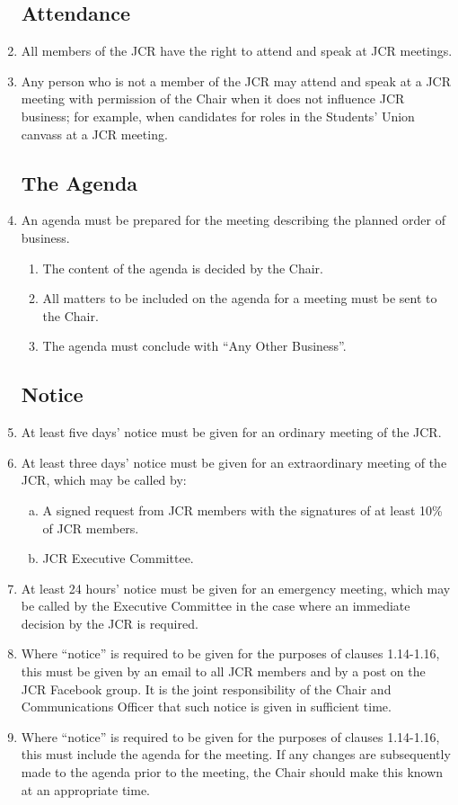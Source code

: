 \documentclass[12pt]{article}
\begin{document}
\begin{enumerate}
    \subsection{Attendance}
    \item All members of the JCR have the right to attend and speak at JCR meetings.
    \item Any person who is not a member of the JCR may attend and speak at a JCR meeting with permission of the Chair when it does not influence JCR business; for example, when candidates for roles in the Students’ Union canvass at a JCR meeting.
    \subsection{The Agenda}
    \item An agenda must be prepared for the meeting describing the planned order of business.
    \begin{enumerate}
        \item The content of the agenda is decided by the Chair.
        \item All matters to be included on the agenda for a meeting must be sent to the Chair.
        \item The agenda must conclude with “Any Other Business”.
    \end{enumerate}
    \subsection{Notice}
    \item At least five days’ notice must be given for an ordinary meeting of the JCR.
    \item At least three days’ notice must be given for an extraordinary meeting of the JCR, which may be called by:
    \begin{enumerate}[(a)]
        \item A signed request from JCR members with the signatures of at least 10\% of JCR members.
        \item JCR Executive Committee.
    \end{enumerate}
    \item At least 24 hours’ notice must be given for an emergency meeting, which may be called by the Executive Committee in the case where an immediate decision by the JCR is required.
    \item Where “notice” is required to be given for the purposes of clauses 1.14-1.16, this must be given by an email to all JCR members and by a post on the JCR Facebook group. It is the joint responsibility of the Chair and Communications Officer that such notice is given in sufficient time.
    \item Where “notice” is required to be given for the purposes of clauses 1.14-1.16, this must include the agenda for the meeting. If any changes are subsequently made to the agenda prior to the meeting, the Chair should make this known at an appropriate time.

\end{enumerate}
\end{document}
